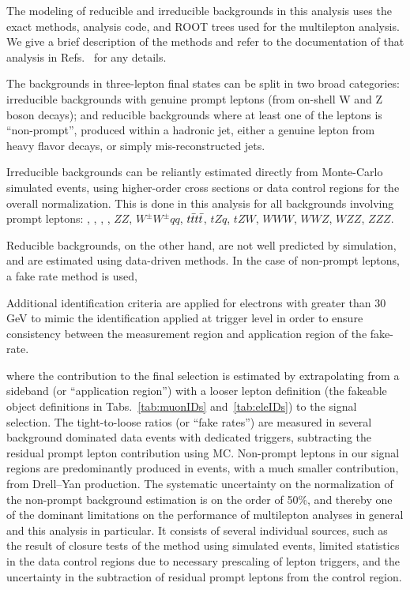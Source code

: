 The modeling of reducible and irreducible backgrounds in this analysis uses the exact methods, analysis code, and ROOT trees used for the \ttH multilepton analysis. We give a brief description of the methods and refer to the documentation of that analysis in Refs.~\cite{CMS_AN_2016-211,CMS_AN_2017-029} for any details.

The backgrounds in three-lepton final states can be split in two broad categories: irreducible backgrounds with genuine prompt leptons (\ie from on-shell W and Z boson decays); and reducible backgrounds where at least one of the leptons is ``non-prompt'', \ie produced within a hadronic jet, either a genuine lepton from heavy flavor decays, or simply mis-reconstructed jets. %

Irreducible backgrounds can be reliantly estimated directly from Monte-Carlo simulated events, using higher-order cross sections or data control regions for the overall normalization. This is done in this analysis for all backgrounds involving prompt leptons: \ttW, \ttZ, \ttH, \WZ, $ZZ$, $W^\pm W^\pm qq$, $t\bar{t}t\bar{t}$, $tZq$, $tZW$, $WWW$, $WWZ$, $WZZ$, $ZZZ$.

Reducible backgrounds, on the other hand, are not well predicted by simulation, and are estimated using data-driven methods. In the case of non-prompt leptons, a fake rate method is used,






 Additional identification criteria are applied for electrons with \pt greater than 30 GeV to mimic the identification applied at trigger level in order to ensure consistency between the measurement region and application region of the fake-rate.









where the contribution to the final selection is estimated by extrapolating from a sideband (or ``application region'') with a looser lepton definition (the fakeable object definitions in Tabs.~\ref{tab:muonIDs} and~\ref{tab:eleIDs}) to the signal selection. The tight-to-loose ratios (or ``fake rates'') are measured in several background dominated data events with dedicated triggers, subtracting the residual prompt lepton contribution using MC. Non-prompt leptons in our signal regions are predominantly produced in \ttbar events, with a much smaller contribution, from Drell--Yan production. The systematic uncertainty on the normalization of the non-prompt background estimation is on the order of 50\%, and thereby one of the dominant limitations on the performance of multilepton analyses in general and this analysis in particular. It consists of several individual sources, such as the result of closure tests of the method using simulated events, limited statistics in the data control regions due to necessary prescaling of lepton triggers, and the uncertainty in the subtraction of residual prompt leptons from the control region.

